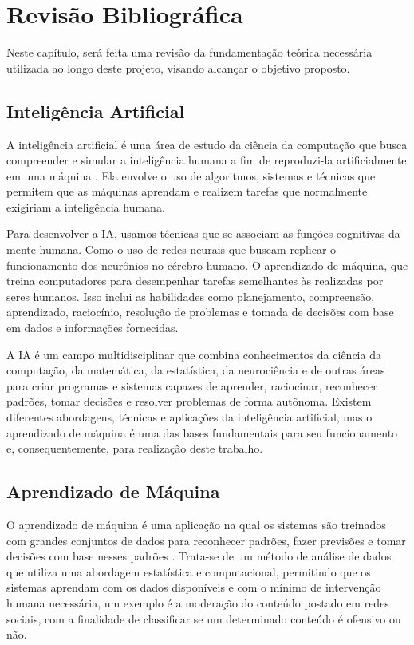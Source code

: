 \chapter{Revisão Bibliográfica}
\label{cap:02}

Neste capítulo, será feita uma revisão da fundamentação teórica necessária utilizada ao longo deste projeto, visando alcançar o objetivo proposto. %

\section{Inteligência Artificial}

A inteligência artificial é uma área de estudo da ciência da computação que busca compreender e simular a inteligência humana a fim de reproduzi-la artificialmente em uma máquina \cite{Haugeland1985}. Ela envolve o uso de algoritmos, sistemas e técnicas que permitem que as máquinas aprendam e realizem tarefas que normalmente exigiriam a inteligência humana.

Para desenvolver a IA, usamos técnicas que se associam as funções cognitivas da mente humana. Como o uso de redes neurais que buscam replicar o funcionamento dos neurônios no cérebro humano. O aprendizado de máquina, que treina computadores para desempenhar tarefas semelhantes às realizadas por seres humanos. Isso inclui as habilidades como planejamento, compreensão, aprendizado, raciocínio, resolução de problemas e tomada de decisões com base em dados e informações fornecidas.

A IA é um campo multidisciplinar que combina conhecimentos da ciência da computação, da matemática, da estatística, da neurociência e de outras áreas para criar programas e sistemas capazes de aprender, raciocinar, reconhecer padrões, tomar decisões e resolver problemas de forma autônoma. Existem diferentes abordagens, técnicas e aplicações da inteligência artificial, mas o aprendizado de máquina é uma das bases fundamentais para seu funcionamento e, consequentemente, para realização deste trabalho.

\section{Aprendizado de Máquina}

O aprendizado de máquina é uma aplicação na qual os sistemas são treinados com grandes conjuntos de dados para reconhecer padrões, fazer previsões e tomar decisões com base nesses padrões \cite{HoschMachineLearning}. Trata-se de um método de análise de dados que utiliza uma abordagem estatística e computacional, permitindo que os sistemas aprendam com os dados disponíveis e com o mínimo de intervenção humana necessária, um exemplo é a moderação do conteúdo postado em redes sociais, com a finalidade de classificar se um determinado conteúdo é ofensivo ou não.

